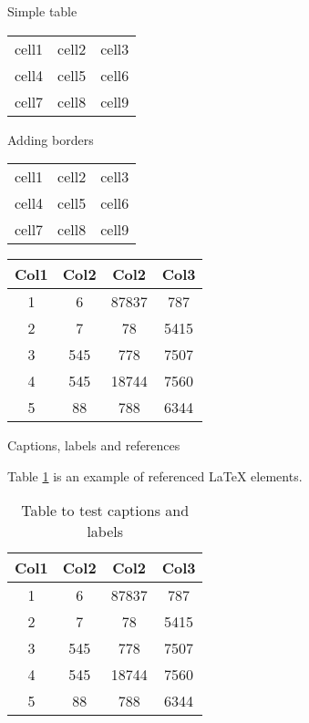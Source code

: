 \documentclass{article}
\begin{document}
    Simple table

    \begin{center}
    \begin{tabular}{ c c c }
    cell1 & cell2 & cell3 \\ 
    cell4 & cell5 & cell6 \\  
    cell7 & cell8 & cell9    
    \end{tabular}
    \end{center}

    Adding borders

    \begin{center}
    \begin{tabular}{ |c|c|c| } 
    \hline
    cell1 & cell2 & cell3 \\ 
    cell4 & cell5 & cell6 \\ 
    cell7 & cell8 & cell9 \\ 
    \hline
    \end{tabular}
    \end{center}

    \begin{center}
    \begin{tabular}{||c c c c||} 
    \hline
    Col1 & Col2 & Col2 & Col3 \\ [0.5ex] 
    \hline\hline
    1 & 6 & 87837 & 787 \\ 
    \hline
    2 & 7 & 78 & 5415 \\
    \hline
    3 & 545 & 778 & 7507 \\
    \hline
    4 & 545 & 18744 & 7560 \\
    \hline
    5 & 88 & 788 & 6344 \\ [1ex] 
    \hline
    \end{tabular}
    \end{center}

    Captions, labels and references

    Table \ref{table:data} is an example of referenced \LaTeX{} elements.

    \begin{table}[h!]
    \centering
    \begin{tabular}{||c c c c||} 
    \hline
    Col1 & Col2 & Col2 & Col3 \\ [0.5ex] 
    \hline\hline
    1 & 6 & 87837 & 787 \\ 
    2 & 7 & 78 & 5415 \\
    3 & 545 & 778 & 7507 \\
    4 & 545 & 18744 & 7560 \\
    5 & 88 & 788 & 6344 \\ [1ex] 
    \hline
    \end{tabular}
    \caption{Table to test captions and labels}
    \label{table:data}
    \end{table}
\end{document}
